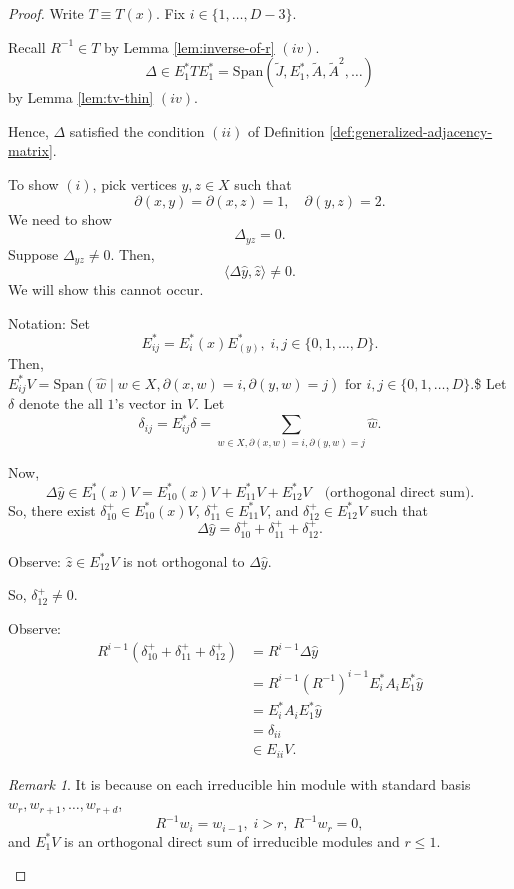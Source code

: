 \documentclass[
]{book}
\theoremstyle{definition}
\theoremstyle{definition}
\theoremstyle{definition}
\theoremstyle{definition}
\theoremstyle{remark}
\newtheorem*{remark}{Remark}
\begin{document}
\begin{proof}
Write \(T \equiv T(x)\). Fix \(i\in \{1, \ldots, D-3\}\).

Recall \(R^{-1}\in T\) by Lemma \ref{lem:inverse-of-r} \((iv)\).
\[\Delta \in E^*_1TE^*_1 = \mathrm{Span}(\tilde{J}, E^*_1, \tilde{A}, \tilde{A}^2, \ldots)\]
by Lemma \ref{lem:tv-thin} \((iv)\).

Hence, \(\Delta\) satisfied the condition \((ii)\) of Definition \ref{def:generalized-adjacency-matrix}.

To show \((i)\), pick vertices \(y,z\in X\) such that
\[\partial(x,y) = \partial(x,z) = 1, \quad \partial(y,z) = 2.\]
We need to show
\[\Delta_{yz} = 0.\]
Suppose \(\Delta_{yz}\neq 0\). Then,
\[\langle \Delta\hat{y},\hat{z}\rangle \neq 0.\]
We will show this cannot occur.

Notation: Set
\[E^*_{ij} = E^*_i(x)E^*_(y), \; i,j\in \{0, 1, \ldots, D\}.\]
Then,
\(E^*_{ij}V = \mathrm{Span}(\hat{w}\mid w\in X, \partial(x,w)=i, \partial(y,w)=j) \text{ for } i,j\in \{0, 1, \ldots, D\}.\)\$
Let \(\delta\) denote the all \(1\)'s vector in \(V\). Let
\[\delta_{ij} = E^*_{ij}\delta = \sum_{w\in X, \partial(x,w)=i, \partial(y,w)=j}\hat{w}.\]

Now,
\[\Delta\hat{y} \in E^*_1(x)V = E^*_{10}(x)V + E^*_{11}V + E^*_{12}V \quad \text{(orthogonal direct sum)}.\]
So, there exist \(\delta^+_{10}\in E^*_{10}(x)V\), \(\delta^+_{11}\in E^*_{11}V\), and \(\delta^+_{12}\in E^*_{12}V\) such that
\[\Delta \hat{y} = \delta^+_{10} + \delta^+_{11} + \delta^+_{12}.\]

Observe: \(\hat{z}\in E^*_{12}V\) is not orthogonal to \(\Delta \hat{y}\).

So, \(\delta^+_{12}\neq 0\).

Observe:
\begin{align}
R^{i-1}(\delta^+_{10} + \delta^+_{11} + \delta^+_{12}) & = R^{i-1}\Delta\hat{y}\\
& = R^{i-1}(R^{-1})^{i-1}E^*_iA_iE^*_1\hat{y}\\
& = E^*_iA_iE^*_1\hat{y}\\
& = \delta_{ii}\\
& \in E_{ii}V.
\end{align}

\begin{remark}
It is because on each irreducible hin module with standard basis \(w_r, w_{r+1}, \ldots, w_{r+d}\),
\[R^{-1}w_i = w_{i-1}, \; i>r, \; R^{-1}w_r = 0,\]
and \(E^*_1V\) is an orthogonal direct sum of irreducible modules and \(r\leq 1\).
\end{remark}


\end{proof}
\end{document}
